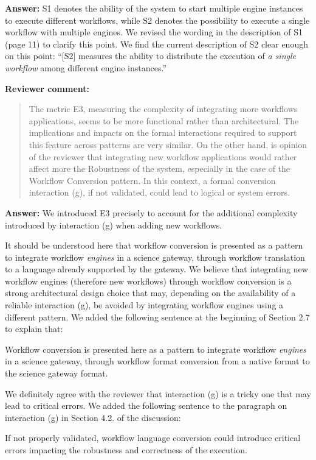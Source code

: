 \documentclass[a4]{letter}
\newenvironment{review}%
{\textbf{Reviewer comment:}\begin{quote}}%
{\end{quote}}%
\newcommand{\answer}[1]{\textbf{Answer:} #1}
\newcommand{\revised}[1]{\color{blue} #1\color{black}}
\begin{document}
\begin{letter}{}
\answer{S1 denotes the ability of the system to start multiple engine
  instances to execute different workflows, while S2 denotes the
  possibility to execute a single workflow with multiple engines. We
  revised the wording in the description of S1 (page 11) to clarify
  this point. We find the current description of S2 clear enough on
  this point: ``[S2] measures the ability to distribute the execution of
  \emph{a single workflow} among different engine instances.''}

\begin{review}
The metric E3, measuring the complexity of integrating more workflows applications, seems to be more functional rather than architectural. The implications and impacts on the formal interactions required to support this feature across patterns are very similar.
 On the other hand, is opinion of the reviewer that integrating new workflow applications would rather affect more the Robustness of the system, especially in the case of the Workflow Conversion pattern. In this context, a formal conversion interaction (g), if not validated, could lead to logical or system errors.
\end{review}

\answer{We introduced E3 precisely to account for the additional
  complexity introduced by interaction (g) when adding new
  workflows. 

It should be understood here that workflow conversion is
  presented as a pattern to integrate workflow \emph{engines} in a
  science gateway, through workflow translation to a language already
  supported by the gateway. We believe that integrating new workflow
  engines (therefore new workflows) through workflow conversion is a
  strong architectural design choice that may, depending on the
  availability of a reliable interaction (g), be avoided by
  integrating workflow engines using a different pattern. We added the following sentence at the beginning of Section 2.7 to explain that:

\revised{Workflow conversion is presented here as a pattern to
integrate workflow \emph{engines} in a science gateway, through
workflow format conversion from a native format to the science gateway
format.}
}

We definitely agree with the reviewer that interaction (g) is
  a tricky one that may lead to critical errors. We added the
  following sentence to the paragraph on interaction (g) in Section
  4.2. of the discussion:

\revised{If not properly validated, workflow language conversion
  could introduce critical errors impacting the robustness and
  correctness of the execution. }


\end{letter}
\end{document}
